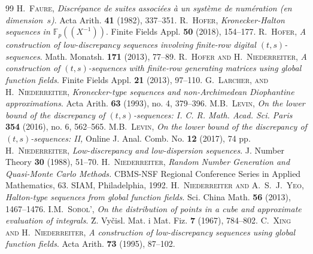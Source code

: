 \documentclass[10pt,a4paper]{amsart}
\newcommand{\FF}{\mathbb{F}}
\renewcommand{\(}{\left (}
\renewcommand{\)}{\right )}
\theoremstyle{definition}
\numberwithin{equation}{section}
\begin{document}
\begin{thebibliography}{99}
 \textsc{H.~Faure}, \textit{Discr\'epance de suites associ\'ees \`a un syst\`eme de num\'eration (en dimension~$s$)}. {Acta Arith.} {{\bf41}} (1982), 337--351.
 \textsc{R.~Hofer}, \textit{Kronecker-Halton sequences in $\FF_p((X^{-1}))$}. {Finite Fields Appl.} {\bf50} (2018), 154--177.
 \textsc{R.~Hofer}, \emph{A construction of low-discrepancy sequences involving finite-row digital $(t,s)$-sequences}. {{Math. Monatsh.}} {\bf171} (2013), 77--89.
 \textsc{R.~Hofer and H.~Niederreiter}, \textit{A construction of $(t,s)$-sequences with finite-row generating matrices using global function fields}. {{Finite Fields Appl.}} {\bf21} (2013), 97--110.
 \textsc{G.~Larcher, and H.~Niederreiter}, \textit{Kronecker-type sequences and non-Archimedean Diophantine approximations}. Acta Arith. {\bf63} (1993), no. 4, 379--396.
 \textsc{M.B.~Levin}, \textit{On the lower bound of the discrepancy of $(t,s)$-sequences: I.} \emph{C. R. Math. Acad. Sci. Paris} \textbf{354} (2016), no. 6, 562--565.
 \textsc{M.B.~Levin}, \textit{On the lower bound of the discrepancy of $(t,s)$-sequences: II,} {Online J. Anal. Comb. No.} {\bf12} (2017), 74 pp.
 \textsc{H.~Niederreiter}, \textit{Low-discrepancy and low-dispersion sequences}. { J. Number Theory} {{\bf30}} (1988), 51--70.
 \textsc{H.~Niederreiter}, \textit{Random Number Generation and Quasi-Monte Carlo Methods.} CBMS-NSF Regional Conference Series in Applied Mathematics, 63. SIAM, Philadelphia, 1992.
 \textsc{H.~Niederreiter and A.~S.~J.~Yeo}, \textit{Halton-type sequences from global function fields}. {{Sci. China Math.}} {\bf56} (2013), 1467--1476.
 \textsc{I.M.~Sobol'}, \textit{On the distribution of points in a cube and approximate evaluation of integrals}. {\u{Z}. Vy\v{c}isl. Mat. i Mat. Fiz.} {{\bf7}} (1967), 784--802.
 \textsc{C.~Xing and H.~Niederreiter}, \textit{A construction of low-discrepancy sequences using global function fields}. {{ Acta Arith.}} {\bf73} (1995), 87--102.
\end{thebibliography}
\end{document}
